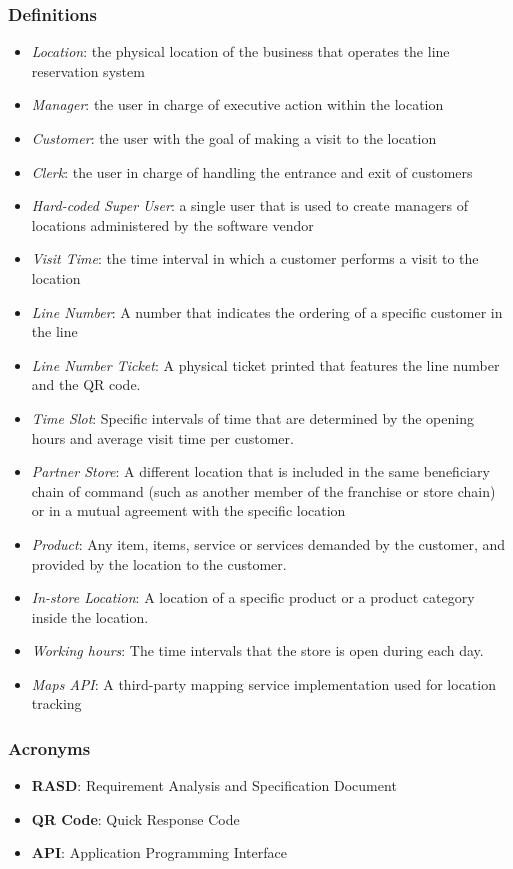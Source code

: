 \subsubsection{Definitions}
\begin{itemize}
    \item \textit{Location}: the physical location of the business that operates the line reservation system
    \item \textit{Manager}: the user in charge of executive action within the location
    \item \textit{Customer}: the user with the goal of making a visit to the location
    \item \textit{Clerk}: the user in charge of handling the entrance and exit of customers
    \item \textit{Hard-coded Super User}: a single user that is used to create managers of locations administered by the software vendor
    \item \textit{Visit Time}: the time interval in which a customer performs a visit to the location
    \item \textit{Line Number}: A number that indicates the ordering of a specific customer in the line
    \item \textit{Line Number Ticket}: A physical ticket printed that features the line number and the QR code.
    \item \textit{Time Slot}: Specific intervals of time that are determined by the opening hours and average visit time per customer.
    \item \textit{Partner Store}: A different location that is included in the same beneficiary chain of command (such as another member of the franchise or store chain) or in a mutual agreement with the specific location
    \item \textit{Product}: Any item, items, service or services demanded by the customer, and provided by the location to the customer.
    \item \textit{In-store Location}: A location of a specific product or a product category inside the location.
    \item \textit{Working hours}: The time intervals that the store is open during each day.
    \item \textit{Maps API}: A third-party mapping service implementation used for location tracking
\end{itemize}
\subsubsection{Acronyms}
\begin{itemize}
    \item \textbf{RASD}: Requirement Analysis and Specification Document
    \item \textbf{QR Code}: Quick Response Code
    \item \textbf{API}: Application Programming Interface
\end{itemize}
